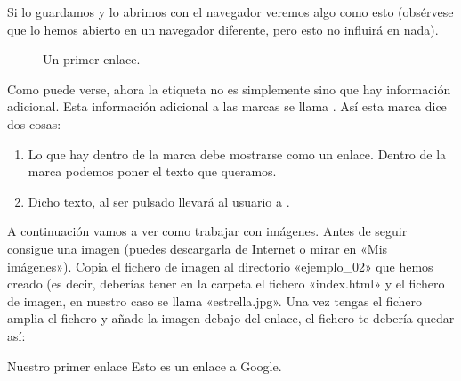 \documentclass[a4paper,12pt,spanish]{sphinxmanual}
\begin{document}
Si lo guardamos y lo abrimos con el navegador veremos algo como esto (obsérvese que lo hemos abierto en un navegador diferente, pero esto no influirá en nada).

\begin{figure}[htbp]
\centering
\capstart

\noindent{}
\caption{Un primer enlace.}\label{\detokenize{index:id13}}\end{figure}

Como puede verse, ahora la etiqueta no es simplemente  sino que hay información adicional. Esta información adicional a las marcas se llama . Así esta marca dice dos cosas:
\begin{enumerate}
\def\theenumi{\arabic{enumi}}
\def\labelenumi{\theenumi .}
\makeatletter\def\p@enumii{\p@enumi \theenumi .}\makeatother
\item {} 
Lo que hay dentro de la marca debe mostrarse como un enlace. Dentro de la marca podemos poner el texto que queramos.

\item {} 
Dicho texto, al ser pulsado llevará al usuario a .

\end{enumerate}

A continuación vamos a ver como trabajar con imágenes. Antes de seguir consigue una imagen (puedes descargarla de Internet o mirar en «Mis imágenes»). Copia el fichero de imagen al directorio «ejemplo\_02» que hemos creado (es decir, deberías tener en la carpeta el fichero «index.html» y el fichero de imagen, en nuestro caso se llama «estrella.jpg». Una vez tengas el fichero amplia el fichero y añade la imagen debajo del enlace, el fichero te debería quedar así:

%
\begin{sphinxVerbatim}[commandchars=\\\{\}]
    Nuestro primer enlace
     Esto es un enlace a Google.
       
\end{sphinxVerbatim}
\end{document}
